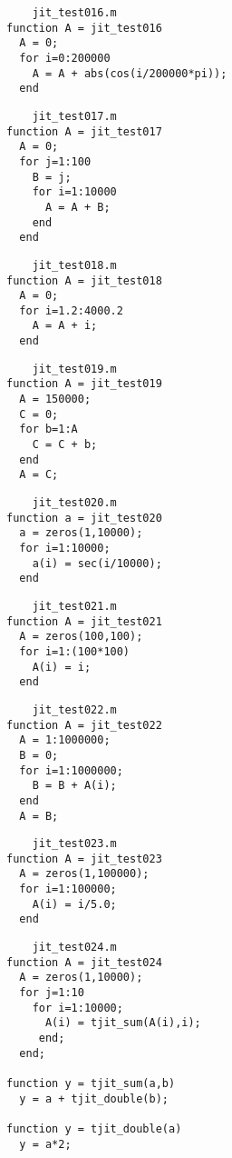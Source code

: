\begin{verbatim}
    jit_test016.m
function A = jit_test016
  A = 0;
  for i=0:200000
    A = A + abs(cos(i/200000*pi));
  end
\end{verbatim}
\begin{verbatim}
    jit_test017.m
function A = jit_test017
  A = 0;
  for j=1:100
    B = j;
    for i=1:10000
      A = A + B;
    end
  end
\end{verbatim}
\begin{verbatim}
    jit_test018.m
function A = jit_test018
  A = 0;
  for i=1.2:4000.2
    A = A + i;
  end
\end{verbatim}
\begin{verbatim}
    jit_test019.m
function A = jit_test019
  A = 150000;
  C = 0;
  for b=1:A
    C = C + b;
  end
  A = C;
\end{verbatim}
\begin{verbatim}
    jit_test020.m
function a = jit_test020
  a = zeros(1,10000);
  for i=1:10000;
    a(i) = sec(i/10000);
  end
\end{verbatim}
\begin{verbatim}
    jit_test021.m
function A = jit_test021
  A = zeros(100,100);
  for i=1:(100*100)
    A(i) = i;
  end
\end{verbatim}
\begin{verbatim}
    jit_test022.m
function A = jit_test022
  A = 1:1000000;
  B = 0;
  for i=1:1000000;
    B = B + A(i);
  end
  A = B;
\end{verbatim}
\begin{verbatim}
    jit_test023.m
function A = jit_test023
  A = zeros(1,100000);
  for i=1:100000;
    A(i) = i/5.0;
  end
\end{verbatim}
\begin{verbatim}
    jit_test024.m
function A = jit_test024
  A = zeros(1,10000);
  for j=1:10
    for i=1:10000;
      A(i) = tjit_sum(A(i),i);
     end;
  end;

function y = tjit_sum(a,b)
  y = a + tjit_double(b);

function y = tjit_double(a)
  y = a*2;
\end{verbatim}
